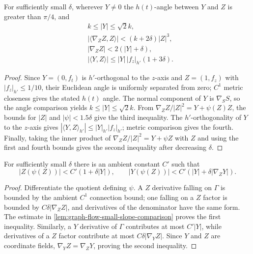 \begin{theorem}
\label{lem:graph-flow-small-slope-comparison}
\notready
For sufficiently small $\delta$, wherever $Y\ne0$ the $h(t)$-angle between
$Y$ and $Z$ is greater than $\pi/4$, and
\begin{align*}
 &k\le|Y|\le\sqrt2k,\\
 &|\langle\nabla_ZZ,Z\rangle|<(k+2\delta)|Z|^3,\\
 &|\nabla_ZZ|<2(|Y|+\delta),\\
 &|\langle Y,Z\rangle|\le|Y|\,|f_z|_{h'}(1+3\delta).
\end{align*}
\end{theorem}
\begin{proof}
Since $Y=(0,f_t)$ is $h'$-orthogonal to the $z$-axis and
$Z=(1,f_z)$ with $|f_z|_{h'}\le1/10$, their Euclidean angle is uniformly
separated from zero; $C^1$ metric closeness gives the stated $h(t)$ angle.
The normal component of $Y$ is
$\nabla_SS$, so the angle comparison yields
$k\le|Y|\le\sqrt2k$.  From
$\nabla_ZZ/|Z|^2=Y+\psi(Z)Z$, the bounds for $|Z|$ and
$|\psi|<1.5\delta$ give the third inequality.  The $h'$-orthogonality of
$Y$ to the $z$-axis gives
$|\langle Y,Z\rangle_{h'}|\le|Y|_{h'}|f_z|_{h'}$; metric comparison gives
the fourth.  Finally, taking the inner product of
$\nabla_ZZ/|Z|^2=Y+\psi Z$ with $Z$ and using the first and fourth bounds
gives the second inequality after decreasing $\delta$.
\end{proof}

\begin{theorem}
\label{lem:graph-flow-drift-derivative-bounds}
\notready
For sufficiently small $\delta$ there is an ambient constant $C'$ such that
\[
 |Z(\psi(Z))|<C'(1+\delta|Y|),
 \qquad
 |Y(\psi(Z))|<C'(|Y|+\delta|\nabla_ZY|).
\]
\end{theorem}
\begin{proof}
Differentiate the quotient defining $\psi$.  A $Z$ derivative falling on
$\Gamma$ is bounded by the ambient $C^1$ connection bound; one falling on a
$Z$ factor is bounded by $C\delta|\nabla_ZZ|$, and derivatives of the
denominator have the same form.  The estimate in
\ref{lem:graph-flow-small-slope-comparison} proves the first inequality.
Similarly, a $Y$
derivative of $\Gamma$ contributes at most $C'|Y|$, while derivatives of a
$Z$ factor contribute at most $C\delta|\nabla_YZ|$.  Since $Y$ and $Z$ are
coordinate fields, $\nabla_YZ=\nabla_ZY$, proving the second inequality.
\end{proof}

